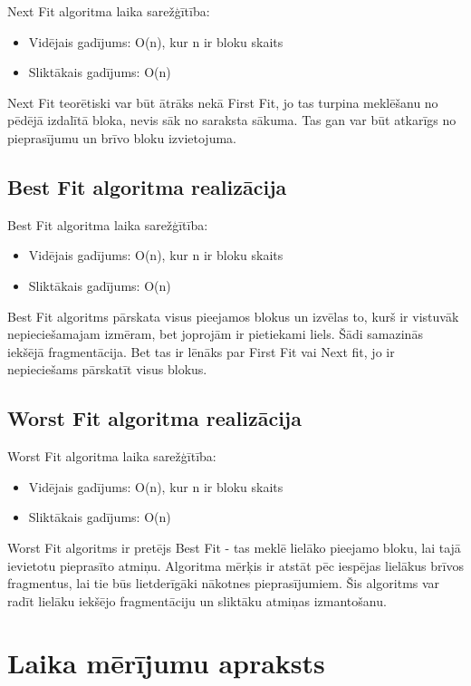 \documentclass{report}
\begin{document}
	Next Fit algoritma laika sarežģītība:
	\begin{itemize}
		\item Vidējais gadījums: O(n), kur n ir bloku skaits
		\item Sliktākais gadījums: O(n)
	\end{itemize}
	
	Next Fit teorētiski var būt ātrāks nekā First Fit, jo tas turpina meklēšanu no pēdējā izdalītā bloka, nevis sāk no saraksta sākuma. Tas gan var būt atkarīgs no pieprasījumu un brīvo bloku izvietojuma. 
	
	\subsection{Best Fit algoritma realizācija}
	
	Best Fit algoritma laika sarežģītība:
	\begin{itemize}
		\item Vidējais gadījums: O(n), kur n ir bloku skaits
		\item Sliktākais gadījums: O(n)
	\end{itemize}
	
	Best Fit algoritms pārskata visus pieejamos blokus un izvēlas to, kurš ir vistuvāk nepieciešamajam izmēram, bet joprojām ir pietiekami liels. Šādi samazinās iekšējā fragmentācija. Bet tas ir lēnāks par First Fit vai Next fit, jo ir nepieciešams pārskatīt visus blokus. 
	
	\subsection{Worst Fit algoritma realizācija}
	
	Worst Fit algoritma laika sarežģītība:
	\begin{itemize}
		\item Vidējais gadījums: O(n), kur n ir bloku skaits
		\item Sliktākais gadījums: O(n)
	\end{itemize}
	
	Worst Fit algoritms ir pretējs Best Fit - tas meklē lielāko pieejamo bloku, lai tajā ievietotu pieprasīto atmiņu. Algoritma mērķis ir atstāt pēc iespējas lielākus brīvos fragmentus, lai tie būs lietderīgāki nākotnes pieprasījumiem. Šis algoritms var radīt lielāku iekšējo fragmentāciju un sliktāku atmiņas izmantošanu.
	
	\section{Laika mērījumu apraksts}
	
\end{document}
